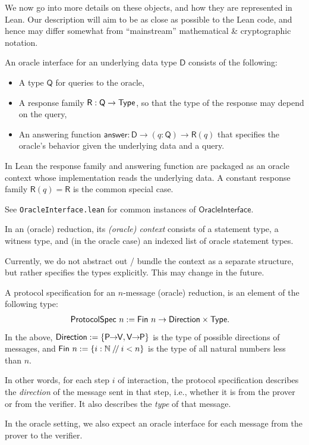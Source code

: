 We now go into more details on these objects, and how they are represented in Lean. Our description will aim to be as close as possible to the Lean code, and hence may differ somewhat from ``mainstream'' mathematical \& cryptographic notation.

\begin{definition}
    \label{def:oracle_interface}
    An oracle interface for an underlying data type \(\mathsf{D}\) consists of the following:
    \begin{itemize}
        \item A type \(\mathsf{Q}\) for queries to the oracle,
        \item A response family \(\mathsf{R} : \mathsf{Q} \to \mathsf{Type}\), so that the type of the
        response may depend on the query,
        \item An answering function \(\mathsf{answer} : \mathsf{D} \to (q : \mathsf{Q}) \to
        \mathsf{R}(q)\) that specifies the oracle's behavior given the underlying data and a query.
    \end{itemize}
    In Lean the response family and answering function are packaged as an oracle context whose
    implementation reads the underlying data. A constant response family \(\mathsf{R}(q) = \mathsf{R}\)
    is the common special case.
    \leanok
\end{definition}

See \texttt{OracleInterface.lean} for common instances of \(\mathsf{OracleInterface}\).


\begin{definition}[Context]
    \label{def:context}
    In an (oracle) reduction, its \emph{(oracle) context} consists of a statement type, a witness
    type, and (in the oracle case) an indexed list of oracle statement types.

    Currently, we do not abstract out / bundle the context as a separate structure, but rather
    specifies the types explicitly. This may change in the future.
\end{definition}

\begin{definition}
    \label{def:protocol_spec}
    A protocol specification for an \(n\)-message (oracle) reduction, is an element of the following type:
    \begin{align*}
        \mathsf{ProtocolSpec}\ n &:= \mathsf{Fin}\ n \to \mathsf{Direction} \times \mathsf{Type}.
    \end{align*}
    In the above, \(\Direction := \{ \PtoVdir, \VtoPdir \}\) is the type of possible directions of messages, and \(\mathsf{Fin}\ n := \{ i : \mathbb{N} \mathbin{/\!/} i < n \}\) is the type of all natural numbers less than \(n\).

    In other words, for each step \(i\) of interaction, the protocol specification describes the \emph{direction} of the message sent in that step, i.e., whether it is from the prover or from the verifier. It also describes the \emph{type} of that message.

    In the oracle setting, we also expect an oracle interface for each message from the prover to the verifier.
    \leanok
\end{definition}

